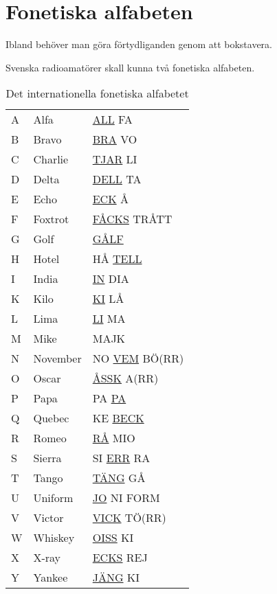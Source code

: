 \section{Fonetiska alfabeten}

Ibland behöver man göra förtydliganden genom att bokstavera.

Svenska radioamatörer skall kunna två fonetiska alfabeten.


\begin{table}[htbp]
  \label{tab:bokstavering-internationell}
  \caption{Det internationella fonetiska alfabetet}
  \begin{tabular}{lll}
    A & Alfa  & \underline{ALL} FA \\
    B & Bravo & \underline{BRA} VO \\
    C & Charlie & \underline{TJAR} LI \\
    D & Delta & \underline{DELL} TA \\
    E & Echo & \underline{ECK} Å \\
    F & Foxtrot & \underline{FÅCKS} TRÅTT \\
    G & Golf & \underline{GÅLF} \\
    H & Hotel & HÅ \underline{TELL} \\
    I & India & \underline{IN} DIA \\
    K & Kilo & \underline{KI} LÅ \\
    L & Lima & \underline{LI} MA \\
    M & Mike & MAJK \\
    N & November & NO \underline{VEM} BÖ(RR) \\
    O & Oscar & \underline{ÅSSK} A(RR) \\
    P & Papa & PA \underline{PA} \\
    Q & Quebec & KE \underline{BECK} \\
    R & Romeo & \underline{RÅ} MIO \\
    S & Sierra & SI \underline{ERR} RA \\
    T & Tango & \underline{TÄNG} GÅ \\
    U & Uniform & \underline{JO} NI FORM \\
    V & Victor & \underline{VICK} TÖ(RR) \\
    W & Whiskey & \underline{OISS} KI \\
    X & X-ray & \underline{ECKS} REJ \\
    Y & Yankee & \underline{JÄNG} KI \\

\end{tabular}
\end{table}
